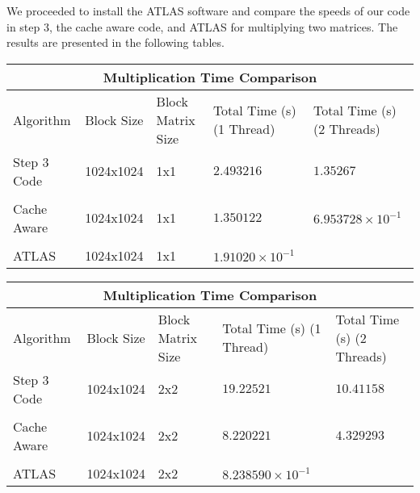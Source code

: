 \documentclass[12pt]{article}
\newcommand{\0}{\mathbf{0}}
\begin{document}
	We proceeded to install the ATLAS software and compare the speeds of our code in step 3, the cache aware code, and ATLAS for multiplying two matrices. The results are presented in the following tables. \\
	
	
	
	\begin{center}
		
		\begin{tabular}{ |p{2cm}| |p{2cm}| |p{2cm}||p{3cm}||p{3cm}|}
			\hline
			\multicolumn{5}{|c|}{Multiplication Time Comparison } \\
			\hline
			Algorithm& Block Size &Block Matrix Size & Total Time (s) (1 Thread)& Total Time (s) (2 Threads)\\
			\hline
			Step 3 Code & 1024x1024 &  1x1& $2.493216$  & $1.35267$    \\
			&  &  & & \\
			
			Cache Aware & 1024x1024& 1x1 &  $1.350122$ & $6.953728\times10^{-1}$   \\ 
			
			& & & & \\
			
			ATLAS & 1024x1024 & 1x1 & $1.91020\times10^{-1}$&  \\
			
			
			\hline
		\end{tabular}
		
	\end{center}
	
	
	\begin{center}
		
		\begin{tabular}{ |p{2cm}| |p{2cm}| |p{2cm}||p{3cm}||p{3cm}|}
			\hline
			\multicolumn{5}{|c|}{Multiplication Time Comparison } \\
			\hline
			Algorithm& Block Size &Block Matrix Size & Total Time (s) (1 Thread)& Total Time (s) (2 Threads)\\
			\hline
			Step 3 Code & 1024x1024 &  2x2& $19.22521$  & $10.41158$    \\
			&  &  & & \\
			
			Cache Aware & 1024x1024& 2x2 &  $8.220221$ & $4.329293$   \\ 
			
			& & & & \\
			
			ATLAS & 1024x1024 & 2x2 & $8.238590\times10^{-1}$&  \\
			
			
			\hline
		\end{tabular}
		
	\end{center}
	
\end{document}
